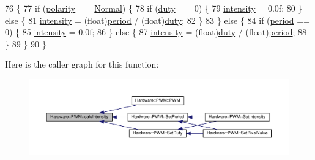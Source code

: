 \begin{DoxyCode}
76                         \{
77   \textcolor{keywordflow}{if} (\hyperlink{class_hardware_1_1_p_w_m_ad346586d086f8462c3de6a4c19edb1d3}{polarity} == \hyperlink{class_hardware_1_1_p_w_m_a728111433109229b4da1efc953a107c1a90676a804c624195f2b488a0a8fdc82e}{Normal}) \{
78     \textcolor{keywordflow}{if} (\hyperlink{class_hardware_1_1_p_w_m_a3309b2645c4c817384d91f33f0df5d64}{duty} == 0) \{
79       \hyperlink{class_hardware_1_1_p_w_m_afcfc81ddeeb9c510ad4d00b215477d7a}{intensity} = 0.0f;
80     \} \textcolor{keywordflow}{else} \{
81       \hyperlink{class_hardware_1_1_p_w_m_afcfc81ddeeb9c510ad4d00b215477d7a}{intensity} = (float)\hyperlink{class_hardware_1_1_p_w_m_a91323a511e37d396f46d08f4159ef761}{period} / (\textcolor{keywordtype}{float})\hyperlink{class_hardware_1_1_p_w_m_a3309b2645c4c817384d91f33f0df5d64}{duty};
82     \}
83   \} \textcolor{keywordflow}{else} \{
84     \textcolor{keywordflow}{if} (\hyperlink{class_hardware_1_1_p_w_m_a91323a511e37d396f46d08f4159ef761}{period} == 0) \{
85       \hyperlink{class_hardware_1_1_p_w_m_afcfc81ddeeb9c510ad4d00b215477d7a}{intensity} = 0.0f;
86     \} \textcolor{keywordflow}{else} \{
87       \hyperlink{class_hardware_1_1_p_w_m_afcfc81ddeeb9c510ad4d00b215477d7a}{intensity} = (float)\hyperlink{class_hardware_1_1_p_w_m_a3309b2645c4c817384d91f33f0df5d64}{duty} / (\textcolor{keywordtype}{float})\hyperlink{class_hardware_1_1_p_w_m_a91323a511e37d396f46d08f4159ef761}{period};
88     \}
89   \}
90 \}
\end{DoxyCode}


Here is the caller graph for this function\+:\nopagebreak
\begin{figure}[H]
\begin{center}
\leavevmode
\includegraphics[width=350pt]{class_hardware_1_1_p_w_m_a891abdbbd00aae4f0a4afdf0a9e3a160_icgraph}
\end{center}
\end{figure}


\hypertarget{class_hardware_1_1_p_w_m_ad826f2fc67d34bc3c6d5fc859c32c1cc}{}
